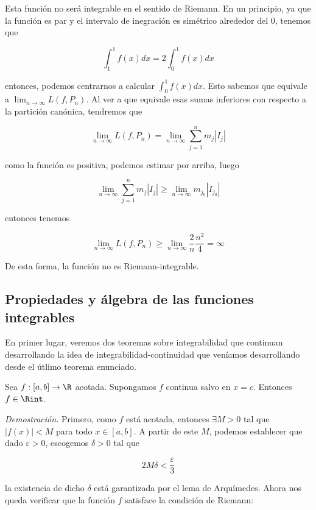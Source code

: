 Esta función no será integrable en el sentido de Riemann. En un principio, ya que la función es par y el intervalo de inegración es simétrico alrededor del 0, tenemos que

\[
\int_1^1 f(x)dx = 2\int_0^1 f(x)dx
\]

\noindent entonces, podemos centrarnos a calcular $\int_0^1 f(x)dx$. Esto sabemos que equivale a $\lim_{n \to \infty} L(f, P_n)$. Al ver a que equivale esas sumas inferiores con respecto a la partición canónica, tendremos que

\[
\lim_{n \to \infty} L(f, P_n) = \lim_{n \to \infty} \sum_{j=1}^n m_j|I_j|
\]

\noindent como la función es positiva, podemos estimar por arriba, luego

\[
\lim_{n \to \infty} \sum_{j=1}^n m_j|I_j| \geq \lim_{n \to \infty} m_{j_0}|I_{j_0}|
\]

\noindent entonces tenemos

\[
\lim_{n \to \infty} L(f, P_n) \geq \lim_{n \to \infty} \frac{2}{n} \frac{n^2}{4} = \infty
\]

De esta forma, la función no es Riemann-integrable.

\subsection{Propiedades y álgebra de las funciones integrables}

En primer lugar, veremos dos teoremas sobre integrabilidad que continuan desarrollando la idea de integrabilidad-continuidad que veníamos desarrollando desde el útlimo teorema enunciado.

\begin{teo}
    Sea $f: [a,b] \rightarrow \R$ acotada. Supongamos $f$ continua salvo en $x=c$. Entonces $f \in \Rint$.
\end{teo}

 \noindent\textit{Demostración.} Primero, como $f$ está acotada, entonces $\exists M>0$ tal que $|f(x)|<M$ para todo $x \in [a,b]$. A partir de este $M$, podemos establecer que dado $\varepsilon > 0$, escogemos $\delta >0$ tal que
    
\[
2M\delta < \frac{\varepsilon}{3}
\]
    
\noindent la existencia de dicho $\delta$ está garantizada por el lema de Arquímedes. Ahora nos queda verificar que la función $f$ satisface la condición de Riemann:
    
